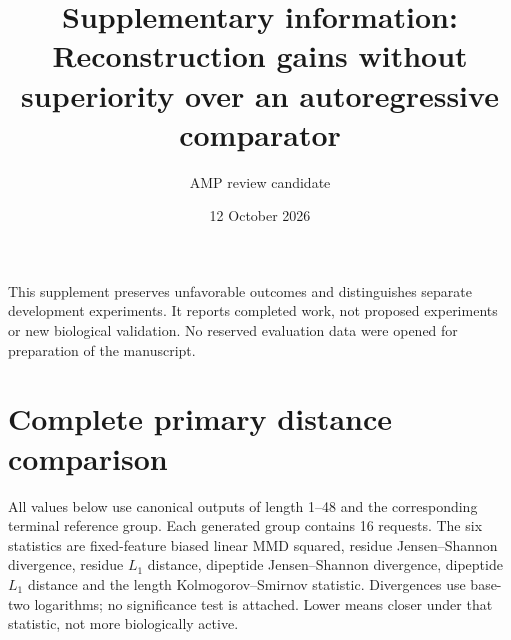 \documentclass[12pt,a4paper]{article}
\title{Supplementary information:\\Reconstruction gains without superiority over an autoregressive comparator}
\author{AMP review candidate}\date{12 October 2026}
\begin{document}
\linenumbers\maketitle
This supplement preserves unfavorable outcomes and distinguishes separate development experiments. It reports completed work, not proposed experiments or new biological validation. No reserved evaluation data were opened for preparation of the manuscript.

\section{Complete primary distance comparison}
All values below use canonical outputs of length 1--48 and the corresponding terminal reference group. Each generated group contains 16 requests. The six statistics are fixed-feature biased linear MMD squared, residue Jensen--Shannon divergence, residue $L_1$ distance, dipeptide Jensen--Shannon divergence, dipeptide $L_1$ distance and the length Kolmogorov--Smirnov statistic. Divergences use base-two logarithms; no significance test is attached. Lower means closer under that statistic, not more biologically active.
\end{document}
